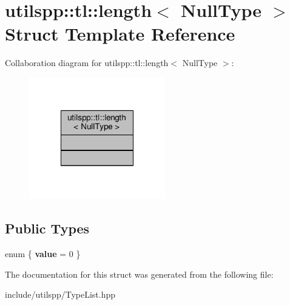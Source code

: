 \hypertarget{structutilspp_1_1tl_1_1length_3_01NullType_01_4}{\section{utilspp\-:\-:tl\-:\-:length$<$ Null\-Type $>$ Struct Template Reference}
\label{structutilspp_1_1tl_1_1length_3_01NullType_01_4}
}


Collaboration diagram for utilspp\-:\-:tl\-:\-:length$<$ Null\-Type $>$\-:
\nopagebreak
\begin{figure}[H]
\begin{center}
\leavevmode
\includegraphics[width=168pt]{structutilspp_1_1tl_1_1length_3_01NullType_01_4__coll__graph}
\end{center}
\end{figure}
\subsection*{Public Types}
\begin{DoxyCompactItemize}
\item 
enum \{ {\bfseries value} = 0
 \}
\end{DoxyCompactItemize}


The documentation for this struct was generated from the following file\-:\begin{DoxyCompactItemize}
\item 
include/utilspp/Type\-List.\-hpp\end{DoxyCompactItemize}
